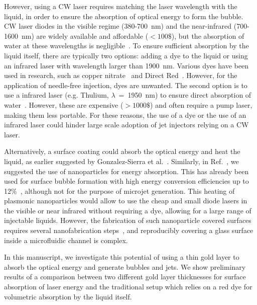 \documentclass[11pt]{article}
\begin{document}
However, using a CW laser requires matching the laser wavelength with the liquid, in order to ensure the absorption of optical energy to form the bubble. CW laser diodes in the visible regime (380-700~nm) and the near-infrared (700-1600~nm) are widely available and affordable ($<100\$$), but the absorption of water at these wavelengths is negligible~\cite{Ruru2012}. To ensure sufficient absorption by the liquid itself, there are typically two options: adding a dye to the liquid or using an infrared laser with wavelength larger than 1900~nm. Various dyes have been used in research, such as copper nitrate~\cite{Gonzalez-sierra2023,ZacaMoran2020b,Berrospe-Rodriguez2017} and Direct Red~\cite{OyarteGalvez2019, VanderVen2023}. However, for the application of needle-free injection, dyes are unwanted. The second option is to use a infrared laser (e.g. Thulium, $\lambda$~=~1950~nm) to ensure direct absorption of water~\cite{Schoppink2023-ETFS,Schoppink2023-POF,Schoppink2024}. However, these are expensive ($>1000\$$) and often require a pump laser, making them less portable. For these reasons, the use of a dye or the use of an infrared laser could hinder large scale adoption of jet injectors relying on a CW laser.

Alternatively, a surface coating could absorb the optical energy and heat the liquid, as earlier suggested by Gonzalez-Sierra et al.~\cite{Gonzalez-sierra2023}. Similarly, in Ref.~\cite{Schoppink2022}, we suggested the use of nanoparticles for energy absorption. This has already been used for surface bubble formation with high energy conversion efficiencies up to 12\%~\cite{Detert2020}, although not for the purpose of microjet generation. This heating of plasmonic nanoparticles would allow to use the cheap and small diode lasers in the visible or near infrared without requiring a dye, allowing for a large range of injectable liquids. However, the fabrication of such nanoparticle covered surfaces requires several nanofabrication steps~\cite{Wang2017}, and reproducibly covering a glass surface inside a microfluidic channel is complex.

In this manuscript, we investigate this potential of using a thin gold layer to absorb the optical energy and generate bubbles and jets. We show preliminary results of a comparison between two different gold layer thicknesses for surface absorption of laser energy and the traditional setup which relies on a red dye for volumetric absorption by the liquid itself. 
\end{document}
